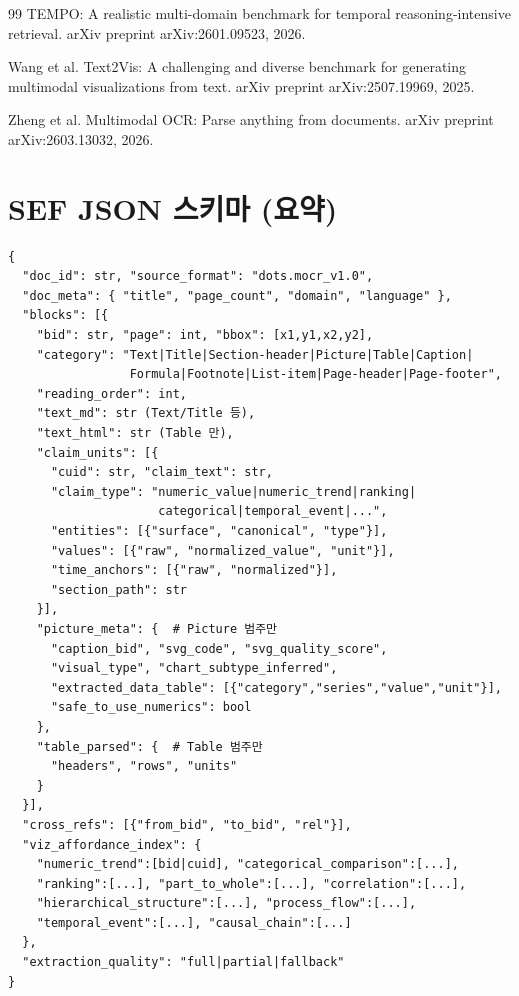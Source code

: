\documentclass[11pt]{article}
\begin{document}
\begin{thebibliography}{99}
TEMPO: A realistic multi-domain benchmark for temporal reasoning-intensive retrieval. arXiv preprint arXiv:2601.09523, 2026.

Wang et al. Text2Vis: A challenging and diverse benchmark for generating multimodal visualizations from text. arXiv preprint arXiv:2507.19969, 2025.

Zheng et al. Multimodal OCR: Parse anything from documents. arXiv preprint arXiv:2603.13032, 2026.

\end{thebibliography}

\appendix
\section{SEF JSON 스키마 (요약)}

\begin{tcolorbox}[colback=gray!5,colframe=gray!50,title=SEF (Strategic Evidence Format) 스키마]
\small
\begin{verbatim}
{
  "doc_id": str, "source_format": "dots.mocr_v1.0",
  "doc_meta": { "title", "page_count", "domain", "language" },
  "blocks": [{
    "bid": str, "page": int, "bbox": [x1,y1,x2,y2],
    "category": "Text|Title|Section-header|Picture|Table|Caption|
                 Formula|Footnote|List-item|Page-header|Page-footer",
    "reading_order": int,
    "text_md": str (Text/Title 등),
    "text_html": str (Table 만),
    "claim_units": [{
      "cuid": str, "claim_text": str,
      "claim_type": "numeric_value|numeric_trend|ranking|
                     categorical|temporal_event|...",
      "entities": [{"surface", "canonical", "type"}],
      "values": [{"raw", "normalized_value", "unit"}],
      "time_anchors": [{"raw", "normalized"}],
      "section_path": str
    }],
    "picture_meta": {  # Picture 범주만
      "caption_bid", "svg_code", "svg_quality_score",
      "visual_type", "chart_subtype_inferred",
      "extracted_data_table": [{"category","series","value","unit"}],
      "safe_to_use_numerics": bool
    },
    "table_parsed": {  # Table 범주만
      "headers", "rows", "units"
    }
  }],
  "cross_refs": [{"from_bid", "to_bid", "rel"}],
  "viz_affordance_index": {
    "numeric_trend":[bid|cuid], "categorical_comparison":[...],
    "ranking":[...], "part_to_whole":[...], "correlation":[...],
    "hierarchical_structure":[...], "process_flow":[...],
    "temporal_event":[...], "causal_chain":[...]
  },
  "extraction_quality": "full|partial|fallback"
}
\end{verbatim}
\end{tcolorbox}
\end{document}
